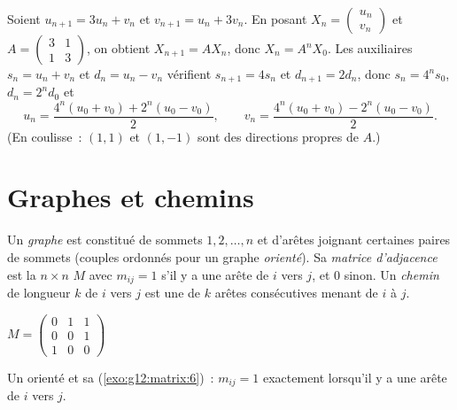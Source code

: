 \begin{example}\label{ex:g12:matrix:coupled}
Soient $u_{n+1} = 3u_n + v_n$ et $v_{n+1} = u_n + 3v_n$. En posant
$X_n = \begin{pmatrix} u_n\\ v_n \end{pmatrix}$ et
$A = \begin{pmatrix} 3 & 1\\ 1 & 3\end{pmatrix}$, on obtient
$X_{n+1} = AX_n$, donc $X_n = A^n X_0$. Les  auxiliaires
$s_n = u_n + v_n$ et $d_n = u_n - v_n$ vérifient $s_{n+1} = 4s_n$ et
$d_{n+1} = 2d_n$, donc $s_n = 4^n s_0$, $d_n = 2^n d_0$ et
\[
u_n = \frac{4^n(u_0+v_0) + 2^n(u_0-v_0)}{2}, \qquad
v_n = \frac{4^n(u_0+v_0) - 2^n(u_0-v_0)}{2}.
\]
(En coulisse~: $(1,1)$ et $(1,-1)$ sont des directions propres de $A$.)
\end{example}

\section{Graphes et chemins}

\begin{definition}\label{def:g12:matrix:graph}
Un \emph{graphe} est constitué de sommets $1, 2, \dots, n$ et
d'arêtes joignant certaines paires de sommets (couples ordonnés pour un
graphe \emph{orienté}). Sa \emph{matrice d'adjacence}
est la  $n \times n$ $M$ avec $m_{ij} = 1$ s'il y a une arête de $i$
vers $j$, et $0$ sinon. Un \emph{chemin} de longueur $k$ de $i$ vers $j$ est
une  de $k$ arêtes consécutives menant de $i$ à $j$.
\end{definition}

\begin{omfigure}
\qquad\qquad
$M = \begin{pmatrix} 0 & 1 & 1\\ 0 & 0 & 1\\ 1 & 0 & 0 \end{pmatrix}$

{\small Un  orienté et sa 
(\cref{exo:g12:matrix:6})~: $m_{ij} = 1$ exactement lorsqu'il y a une arête
de $i$ vers $j$.}
\end{omfigure}

